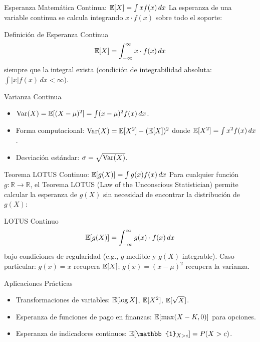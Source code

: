\documentclass[10pt, aspectratio=169]{beamer}
\begin{document}
\begin{frame}{Esperanza Matemática Continua: $\mathbb{E}[X] = \int x f(x)\,dx$}
  \footnotesize
  La esperanza de una variable continua se calcula integrando $x \cdot f(x)$ sobre todo el soporte: \pause

  \vspace{0.1cm}
  \begin{block}{Definición de Esperanza Continua}
    $$\mathbb{E}[X] = \int_{-\infty}^{\infty} x \cdot f(x)\,dx$$
    siempre que la integral exista (condición de integrabilidad absoluta: $\int |x| f(x)\,dx < \infty$).
  \end{block}

  \vspace{0.1cm}
  \pause
  \begin{alertblock}{Varianza Continua}
    \begin{itemize}\itemsep=0.05cm
      \item $\operatorname{Var}(X) = \mathbb{E}[(X - \mu)^{2}] = \int (x - \mu)^{2} f(x)\,dx$.
      \item Forma computacional: $\operatorname{Var}(X) = \mathbb{E}[X^{2}] - (\mathbb{E}[X])^{2}$ donde $\mathbb{E}[X^{2}] = \int x^{2} f(x)\,dx$.
      \item Desviación estándar: $\sigma = \sqrt{\operatorname{Var}(X)}$.
    \end{itemize}
  \end{alertblock}
\end{frame}

\begin{frame}{Teorema LOTUS Continuo: $\mathbb{E}[g(X)] = \int g(x) f(x)\,dx$}
  \footnotesize
  Para cualquier función $g: \mathbb{R} \to \mathbb{R}$, el Teorema LOTUS (Law of the Unconscious Statistician) permite calcular la esperanza de $g(X)$ sin necesidad de encontrar la distribución de $g(X)$: \pause

  \vspace{0.1cm}
  \begin{block}{LOTUS Continuo}
    $$\mathbb{E}[g(X)] = \int_{-\infty}^{\infty} g(x) \cdot f(x)\,dx$$
    bajo condiciones de regularidad (e.g., $g$ medible y $g(X)$ integrable). Caso particular: $g(x) = x$ recupera $\mathbb{E}[X]$; $g(x) = (x - \mu)^{2}$ recupera la varianza.
  \end{block}

  \vspace{0.1cm}
  \pause
  \begin{alertblock}{Aplicaciones Prácticas}
    \begin{itemize}\itemsep=0.05cm
      \item Transformaciones de variables: $\mathbb{E}[\log X]$, $\mathbb{E}[X^{2}]$, $\mathbb{E}[\sqrt{X}]$.
      \item Esperanza de funciones de pago en finanzas: $\mathbb{E}[\max(X - K, 0)]$ para opciones.
      \item Esperanza de indicadores continuos: $\E[\mathbb{1}_{X > c}] = P(X > c)$.
    \end{itemize}
  \end{alertblock}
\end{frame}
\end{document}
